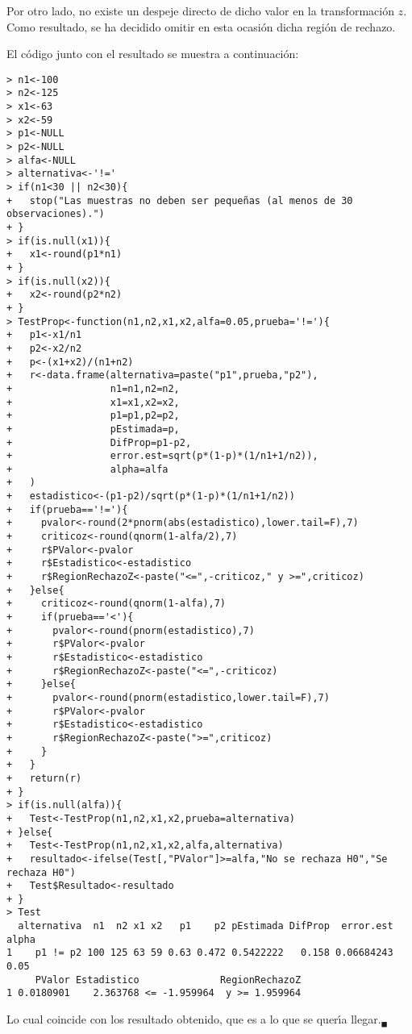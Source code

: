 \begin{solucion}
 Por otro lado, no existe un despeje directo de dicho valor
 en la transformaci\'on $z$.
 Como resultado, se ha decidido omitir en esta ocasi\'on dicha regi\'on de rechazo.
 \par 
 El c\'odigo junto con el resultado se muestra a continuaci\'on:
 \begin{verbatim}
> n1<-100
> n2<-125
> x1<-63
> x2<-59
> p1<-NULL
> p2<-NULL
> alfa<-NULL
> alternativa<-'!='
> if(n1<30 || n2<30){
+   stop("Las muestras no deben ser pequeñas (al menos de 30 observaciones).")
+ }
> if(is.null(x1)){
+   x1<-round(p1*n1)
+ }
> if(is.null(x2)){
+   x2<-round(p2*n2)
+ }
> TestProp<-function(n1,n2,x1,x2,alfa=0.05,prueba='!='){
+   p1<-x1/n1
+   p2<-x2/n2
+   p<-(x1+x2)/(n1+n2)
+   r<-data.frame(alternativa=paste("p1",prueba,"p2"),
+                 n1=n1,n2=n2,
+                 x1=x1,x2=x2,
+                 p1=p1,p2=p2,
+                 pEstimada=p,
+                 DifProp=p1-p2,
+                 error.est=sqrt(p*(1-p)*(1/n1+1/n2)),
+                 alpha=alfa
+   )
+   estadistico<-(p1-p2)/sqrt(p*(1-p)*(1/n1+1/n2))
+   if(prueba=='!='){
+     pvalor<-round(2*pnorm(abs(estadistico),lower.tail=F),7)
+     criticoz<-round(qnorm(1-alfa/2),7)
+     r$PValor<-pvalor
+     r$Estadistico<-estadistico
+     r$RegionRechazoZ<-paste("<=",-criticoz," y >=",criticoz)
+   }else{
+     criticoz<-round(qnorm(1-alfa),7)
+     if(prueba=='<'){
+       pvalor<-round(pnorm(estadistico),7)
+       r$PValor<-pvalor
+       r$Estadistico<-estadistico
+       r$RegionRechazoZ<-paste("<=",-criticoz)
+     }else{
+       pvalor<-round(pnorm(estadistico,lower.tail=F),7)
+       r$PValor<-pvalor
+       r$Estadistico<-estadistico
+       r$RegionRechazoZ<-paste(">=",criticoz)
+     }
+   }
+   return(r)
+ }
> if(is.null(alfa)){
+   Test<-TestProp(n1,n2,x1,x2,prueba=alternativa)
+ }else{
+   Test<-TestProp(n1,n2,x1,x2,alfa,alternativa)
+   resultado<-ifelse(Test[,"PValor"]>=alfa,"No se rechaza H0","Se rechaza H0")
+   Test$Resultado<-resultado
+ }
> Test
  alternativa  n1  n2 x1 x2   p1    p2 pEstimada DifProp  error.est alpha
1    p1 != p2 100 125 63 59 0.63 0.472 0.5422222   0.158 0.06684243  0.05
     PValor Estadistico              RegionRechazoZ
1 0.0180901    2.363768 <= -1.959964  y >= 1.959964
 \end{verbatim}
 Lo cual coincide con los resultado obtenido,
 que es a lo que se quer\'{\i}a llegar.${}_{\blacksquare}$
\end{solucion}
